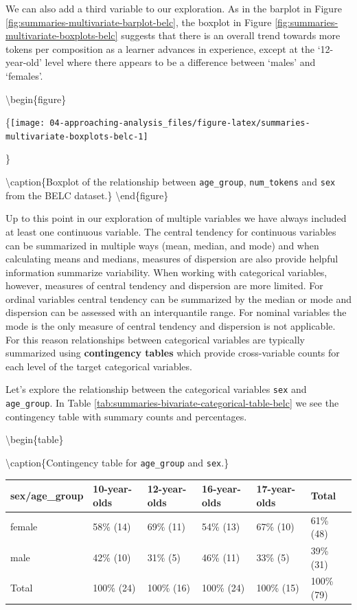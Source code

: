 \documentclass[
]{article}
\begin{document}
We can also add a third variable to our exploration. As in the barplot in Figure \ref{fig:summaries-multivariate-barplot-belc}, the boxplot in Figure \ref{fig:summaries-multivariate-boxplots-belc} suggests that there is an overall trend towards more tokens per composition as a learner advances in experience, except at the `12-year-old' level where there appears to be a difference between `males' and `females'.

\textbackslash begin\{figure\}

\{\centering \texttt{[image: 04-approaching-analysis\_files/figure-latex/summaries-multivariate-boxplots-belc-1]}

\}

\textbackslash caption\{Boxplot of the relationship between \texttt{age\_group}, \texttt{num\_tokens} and \texttt{sex} from the BELC dataset.\}\label{fig:summaries-multivariate-boxplots-belc}
\textbackslash end\{figure\}

Up to this point in our exploration of multiple variables we have always included at least one continuous variable. The central tendency for continuous variables can be summarized in multiple ways (mean, median, and mode) and when calculating means and medians, measures of dispersion are also provide helpful information summarize variability. When working with categorical variables, however, measures of central tendency and dispersion are more limited. For ordinal variables central tendency can be summarized by the median or mode and dispersion can be assessed with an interquantile range. For nominal variables the mode is the only measure of central tendency and dispersion is not applicable. For this reason relationships between categorical variables are typically summarized using \textbf{contingency tables} which provide cross-variable counts for each level of the target categorical variables.

Let's explore the relationship between the categorical variables \texttt{sex} and \texttt{age\_group}. In Table \ref{tab:summaries-bivariate-categorical-table-belc} we see the contingency table with summary counts and percentages.

\textbackslash begin\{table\}

\textbackslash caption\{\label{tab:summaries-bivariate-categorical-table-belc}Contingency table for \texttt{age\_group} and \texttt{sex}.\}
\centering

\begin{tabular}[t]{llllll}
\toprule
sex/age\_group & 10-year-olds & 12-year-olds & 16-year-olds & 17-year-olds & Total\\
\midrule
female & 58\% (14) & 69\% (11) & 54\% (13) & 67\% (10) & 61\% (48)\\
male & 42\% (10) & 31\%  (5) & 46\% (11) & 33\%  (5) & 39\% (31)\\
Total & 100\% (24) & 100\% (16) & 100\% (24) & 100\% (15) & 100\% (79)\\
\bottomrule
\end{tabular}
\end{document}
